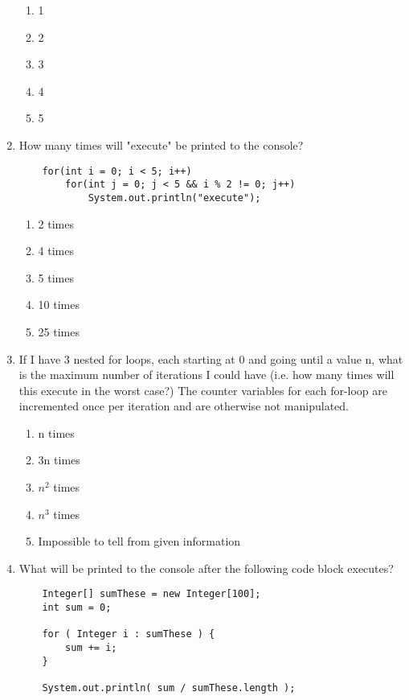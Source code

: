 \documentclass[S17-Final.tex]{subfiles}
\begin{document}
\begin{enumerate}
\begin{enumerate}
\item  1
\item  2
\item  3
\item  4
\item  5
\end{enumerate}

\item How many times will "execute" be printed to the console?
\begin{lstlisting}
    for(int i = 0; i < 5; i++)
        for(int j = 0; j < 5 && i % 2 != 0; j++)
	        System.out.println("execute");
\end{lstlisting}
	
\begin{enumerate}
\item  2 times
\item  4 times
\item  5 times
\item  10 times
\item  25 times
\end{enumerate}

\item If I have 3 nested for loops, each starting at 0 and going until a value n, what is the maximum number of iterations I could have (i.e. how many times will this execute in the worst case?) The counter variables for each for-loop are incremented once per iteration and are otherwise not manipulated.
	
\begin{enumerate}
\item  n times
\item  3n times
\item  $n^{2}$ times
\item  $n^{3}$ times
\item  Impossible to tell from given information
\end{enumerate}

\item What will be printed to the console after the following code block executes?
\begin{lstlisting}
    Integer[] sumThese = new Integer[100]; 
    int sum = 0; 
    
    for ( Integer i : sumThese ) { 
        sum += i; 
    } 
    
    System.out.println( sum / sumThese.length );
\end{lstlisting}
	

\end{enumerate}
\end{document}
